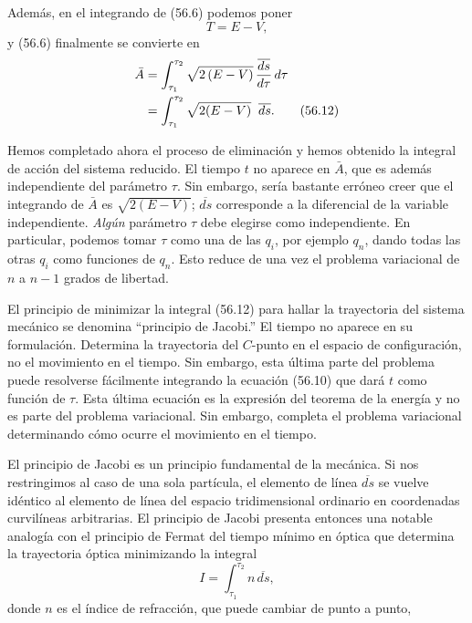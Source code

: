 \documentclass[12pt,a4paper]{book}
\begin{document}

Además, en el integrando de (56.6) podemos poner
\begin{equation}
T = E - V, \tag{56.11}
\end{equation}
y (56.6) finalmente se convierte en
\begin{align}
\bar{A} &= \int_{\tau_1}^{\tau_2} \sqrt{2\,(E - V)}\,\frac{\overline{ds}}{d\tau}\,d\tau \notag \\
&= \int_{\tau_1}^{\tau_2} \sqrt{2(E-V)} \;\; \overline{ds}. \tag{56.12}
\end{align}

Hemos completado ahora el proceso de eliminación y hemos obtenido la integral de acción del sistema reducido. El tiempo $t$ no aparece en $\bar{A}$, que es además independiente del parámetro $\tau$. Sin embargo, sería bastante erróneo creer que el integrando de $\bar{A}$ es $\sqrt{2(E-V)}$; $\overline{ds}$ corresponde a la diferencial de la variable independiente. \textit{Algún} parámetro $\tau$ debe elegirse como independiente. En particular, podemos tomar $\tau$ como una de las $q_i$, por ejemplo $q_n$, dando todas las otras $q_i$ como funciones de $q_n$. Esto reduce de una vez el problema variacional de $n$ a $n-1$ grados de libertad.

El principio de minimizar la integral (56.12) para hallar la trayectoria del sistema mecánico se denomina ``principio de Jacobi.'' El tiempo no aparece en su formulación. Determina la trayectoria del $C$-punto en el espacio de configuración, no el movimiento en el tiempo. Sin embargo, esta última parte del problema puede resolverse fácilmente integrando la ecuación (56.10) que dará $t$ como función de $\tau$. Esta última ecuación es la expresión del teorema de la energía y no es parte del problema variacional. Sin embargo, completa el problema variacional determinando cómo ocurre el movimiento en el tiempo.

El principio de Jacobi es un principio fundamental de la mecánica. Si nos restringimos al caso de una sola partícula, el elemento de línea $\overline{ds}$ se vuelve idéntico al elemento de línea del espacio tridimensional ordinario en coordenadas curvilíneas arbitrarias. El principio de Jacobi presenta entonces una notable analogía con el principio de Fermat del tiempo mínimo en óptica que determina la trayectoria óptica minimizando la integral
\begin{equation}
I = \int_{\tau_1}^{\tau_2} n\,\overline{ds}, \tag{56.13}
\end{equation}
donde $n$ es el índice de refracción, que puede cambiar de punto a punto,
\end{document}
